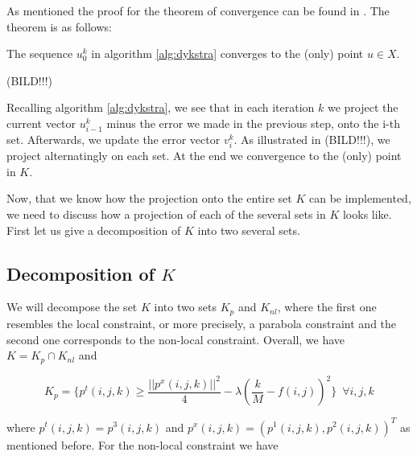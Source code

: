         As mentioned the proof for the theorem of convergence can be found in \cite{dykstra-et-al-aors14}. The theorem is as follows:
        \begin{theorem}[Convergence]
            The sequence $u_{0}^{k}$ in algorithm \ref{alg:dykstra} converges to the (only) point $u \in X$.
        \end{theorem}

        (BILD!!!)

        Recalling algorithm \ref{alg:dykstra}, we see that in each iteration $k$ we project the current vector $u_{i-1}^{k}$ minus the error we made in the previous step, onto the i-th set. Afterwards, we update the error vector $v_{i}^{k}$. As illustrated in (BILD!!!), we project alternatingly on each set. At the end we convergence to the (only) point in $K$.

        Now, that we know how the projection onto the entire set $K$ can be implemented, we need to discuss how a projection of each of the several sets in $K$ looks like. First let us give a decomposition of $K$ into two several sets.

    \subsection{Decomposition of $K$} %
    \label{sub:decomposition_of_K}
        
        We will decompose the set $K$ into two sets $K_{p}$ and $K_{nl}$, where the first one resembles the local constraint, or more precisely, a parabola constraint and the second one corresponds to the non-local constraint. Overall, we have $K = K_{p} \cap K_{nl}$ and

    \begin{equation}
        K_{p} = \bigg\{ p^{t}(i, j, k) \ge \frac{||p^{x}(i, j, k)||^{2}}{4} - \lambda(\frac{k}{M} - f(i,j))^{2} \bigg\} \,\,\, \forall i, j, k \label{eq:parabola}
    \end{equation}

    where $p^{t}(i, j, k) = p^{3}(i, j, k)$ and $p^{x}(i, j, k) = (p^{1}(i, j, k), p^{2}(i, j, k))^{T}$ as mentioned before. For the non-local constraint we have

